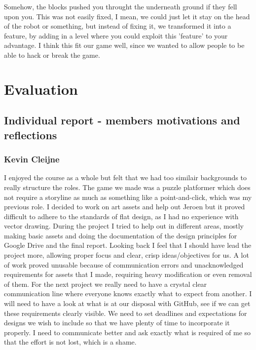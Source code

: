 \documentclass[a4paper,twoside,12pt]{article}
\begin{document}
Somehow, the blocks pushed you throught the underneath ground if they fell upon you. This was not easily fixed, I mean, we could just let it stay on the head of the robot or something, but instead of fixing it, we transformed it into a feature, by adding in a level where you could exploit this 'feature' to your advantage. I think this fit our game well, since we wanted to allow people to be able to hack or break the game.\\


\section{Evaluation}


\subsection{Individual report - members motivations and reflections}

\subsubsection{Kevin Cleijne}

I enjoyed the course as a whole but felt that we had too similair backgrounds to really structure the roles. The game we made was a puzzle platformer which does not require a 
storyline as much as something like a point-and-click, which was my previous role. I decided to work on art assets and help out Jeroen but it proved difficult to adhere to the standards of flat design, as I had no experience with vector drawing. During the project I tried to help out in different areas, mostly making basic assets and doing the documentation of the design principles for Google Drive and the final report. Looking back I feel that I should have lead the project more, allowing proper focus and clear, crisp ideas/objectives for us. A lot of work proved unusable because of communication errors and unacknowledged requirements for assets that I made, requiring heavy modification or even removal of them. For the next project we really need to have a crystal clear communication line where everyone knows exactly what to expect from another. I will need to have a look at what is at our disposal with GitHub, see if we can get these requirements clearly visible. We need to set deadlines and expectations for designs we wish to include so that we have plenty of time to incorporate it properly.
I need to communicate better and ask exactly what is required of me so that the effort is not lost, which is a shame.
\end{document}
